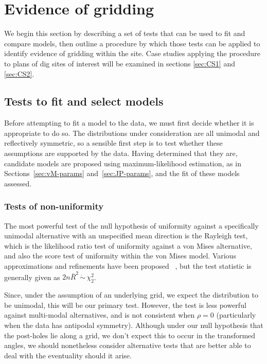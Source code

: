 \documentclass[../../ArchStats.tex]{subfiles}
\begin{document}

\section{Evidence of gridding}

We begin this section by describing a set of tests that can be used to fit and compare models, then outline a procedure by which those tests can be applied to identify evidence of gridding within the site. Case studies applying the procedure to plans of dig sites of interest will be examined in sections \ref{sec:CS1} and \ref{sec:CS2}.

\subsection{Tests to fit and select models}
\label{sec:model-fitting-tests}

Before attempting to fit a model to the data, we must first decide whether it is appropriate to do so. The distributions under consideration are all unimodal and reflectively symmetric, so a sensible first step is to test whether these assumptions are supported by the data. Having determined that they are, candidate models are proposed using maximum-likelihood estimation, as in Sections~\ref{sec:vM-params} and~\ref{sec:JP-params}, and the fit of these models assessed.


\subsubsection{Tests of non-uniformity}
\label{sec:unif-tests}

The most powerful test of the null hypothesis of uniformity against a specifically unimodal alternative with an unspecified mean direction is the Rayleigh test, which is the likelihood ratio test of uniformity against a von Mises alternative, and also the score test of uniformity within the von Mises model. Various approximations and refinements have been proposed ~\cite{Mardia1999}, but the test statistic is generally given as $2n\bar{R}^2 \, \dot{\sim} \, \chi^2_2$.

Since, under the assumption of an underlying grid, we expect the distribution to be unimodal, this will be our primary test. However, the test is less powerful against multi-modal alternatives, and is not consistent when $\rho = 0$ (particularly when the data has antipodal symmetry). Although under our null hypothesis that the post-holes lie along a grid, we don't expect this to occur in the transformed angles, we should nonetheless consider alternative tests that are better able to deal with the eventuality should it arise.
\end{document}
